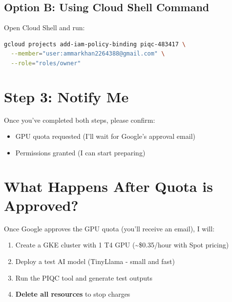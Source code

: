 \documentclass[11pt,a4paper]{article}
\begin{document}
\subsection{Option B: Using Cloud Shell Command}

Open Cloud Shell and run:

\begin{lstlisting}[language=bash]
gcloud projects add-iam-policy-binding piqc-483417 \
  --member="user:ammarkhan2264388@gmail.com" \
  --role="roles/owner"
\end{lstlisting}

\section{Step 3: Notify Me}

Once you've completed both steps, please confirm:

\begin{tcolorbox}[colback=green!5,colframe=green!50!black,title=\textbf{Checklist}]
\begin{itemize}
    \item[$\square$] GPU quota requested (I'll wait for Google's approval email)
    \item[$\square$] Permissions granted (I can start preparing)
\end{itemize}
\end{tcolorbox}

\section{What Happens After Quota is Approved?}

Once Google approves the GPU quota (you'll receive an email), I will:

\begin{enumerate}
    \item Create a GKE cluster with 1 T4 GPU (\textasciitilde\$0.35/hour with Spot pricing)
    \item Deploy a test AI model (TinyLlama - small and fast)
    \item Run the PIQC tool and generate test outputs
    \item \textbf{Delete all resources} to stop charges
\end{enumerate}
\end{document}
